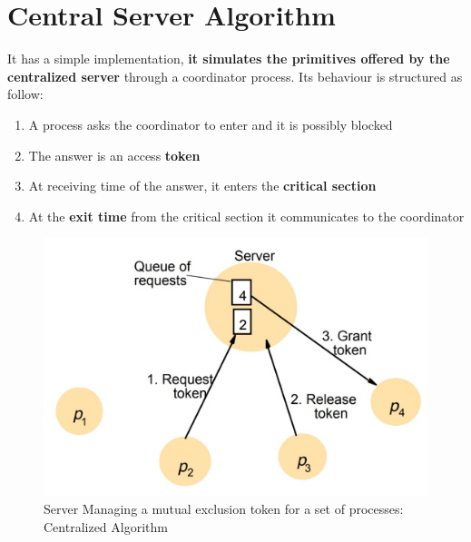 \section{Central Server Algorithm}
It has a simple implementation, \textbf{it simulates the primitives offered by the centralized server} through a coordinator process. Its behaviour is structured as follow:
\begin{enumerate}
    \item A process asks the coordinator to enter and it is possibly blocked
    \item The answer is an access \textbf{token}
    \item At receiving time of the answer, it enters the \textbf{critical section}
    \item At the \textbf{exit time} from the critical section it communicates to the coordinator 
\end{enumerate}

\begin{figure}[!h]
    \centering
    \includegraphics[width=.5\linewidth]{images/SynchronizationCoordinationDS/cebtralizedAlgorithm.jpeg}
    \caption{Server Managing a mutual exclusion token for a set of processes: Centralized Algorithm}
\end{figure}

